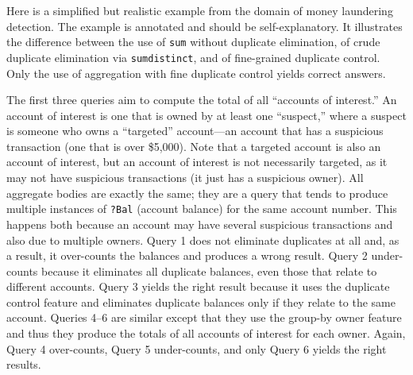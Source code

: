 \documentclass[11pt]{article}
\begin{document}
Here is a simplified but realistic
example from the domain of money laundering detection.
The example is annotated and should be self-explanatory.
It illustrates the difference between the use of \texttt{sum} without
duplicate elimination, of crude duplicate elimination via
\texttt{sumdistinct}, and of fine-grained duplicate control.
Only the use of aggregation with fine duplicate control yields correct answers.

The first three queries aim to compute the total of all ``accounts of
interest.'' 
An account of interest is one that is owned by at least one ``suspect,''
where
a suspect is someone who owns a ``targeted'' account---an account that has a suspicious transaction
(one that is over \$5,000). Note that
a targeted account is also an account of interest, but an account of
interest is not necessarily targeted, as it may not have suspicious
transactions (it just has a suspicious owner).
All aggregate bodies are exactly the same; they are a query that tends to
produce
multiple instances of \texttt{?Bal} (account balance) for the same account
number.
This happens both because an account may have several suspicious
transactions and also due to multiple owners.
Query 1 does not eliminate duplicates at all and, as a result, it
over-counts the balances and produces a wrong result.
Query 2 under-counts because it eliminates all duplicate balances, even
those that relate to different accounts.
Query 3 yields the right result because it  uses the duplicate control
feature and eliminates duplicate balances
only if they relate to the same account.
Queries 4--6 are similar except that they use the group-by owner feature
and thus they produce the totals of all accounts of interest
for each owner. Again, Query 4 over-counts, Query 5 under-counts, and only Query
6 yields the right results.
\end{document}
